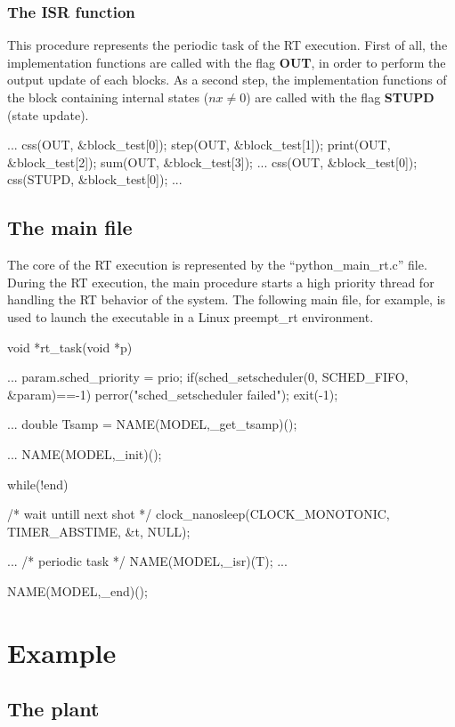\subsection{The ISR function}
This procedure represents the periodic task of the RT execution. First of all, 
the implementation functions are called with the flag \textbf{OUT}, in order to 
perform the output update of each blocks. As a second step, the implementation 
functions of the block containing internal states ($nx \neq 0$) are called with 
the flag \textbf{STUPD} (state update).

\begin{code}
  ...
  css(OUT, &block_test[0]);
  step(OUT, &block_test[1]);
  print(OUT, &block_test[2]);
  sum(OUT, &block_test[3]);
  ...
  css(OUT, &block_test[0]);
  css(STUPD, &block_test[0]);
  ...
\end{code}

\section{The main file}

The core of the RT execution is represented by the ``python\_main\_rt.c'' file. 
During the RT execution, the main procedure starts a high priority thread for 
handling the RT behavior of the system. 
The following main file, for example, is used to launch the executable
in a Linux preempt\_rt environment.

\begin{code}
void *rt_task(void *p)
{
  ...
  param.sched_priority = prio;
  if(sched_setscheduler(0, SCHED_FIFO, &param)==-1){
    perror("sched_setscheduler failed");
    exit(-1);
  }

  ...
  double Tsamp = NAME(MODEL,_get_tsamp)();

  ...
  NAME(MODEL,_init)();

  while(!end){
   /* wait untill next shot */
    clock_nanosleep(CLOCK_MONOTONIC, 
                    TIMER_ABSTIME, &t, NULL);

    ...
    /* periodic task */
    NAME(MODEL,_isr)(T);
    ...
  }
  NAME(MODEL,_end)();  
}
\end{code}

\chapter{Example}
\section{The plant}

